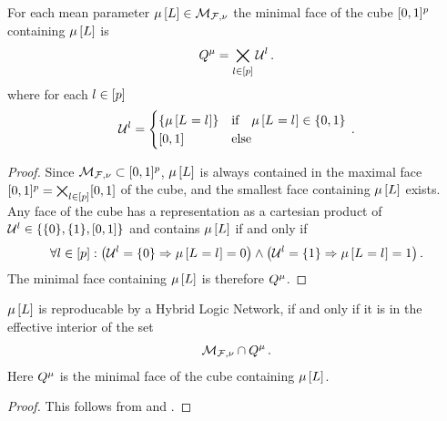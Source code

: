 \begin{lemma}
    \label{lem:minimalContainingFace}
    For each mean parameter $\mu\left[L\right]\in\mathcal{M}_{\mathcal{F},\nu}$ the minimal face of the cube $[0,1]^{p}$ containing $\mu\left[L\right]$ is
    \begin{align*}
        Q^{\mu}
        = \bigtimes_{l\in[p]} \mathcal{U}^{l} \, .
    \end{align*}
    where for each $l\in[p]$
    \begin{align*}
        \mathcal{U}^{l} = \begin{cases}
                                   \{\mu\left[L_{}=l_{}\right]\} & \text{if} \quad \mu\left[L_{}=l_{}\right] \in \{0,1\} \\
                                   [0,1] & \text{else}
        \end{cases} \, .
    \end{align*}
\end{lemma}
\begin{proof}
    Since $\mathcal{M}_{\mathcal{F},\nu}\subset[0,1]^{p}$, $\mu\left[L\right]$ is always contained in the maximal face $[0,1]^{p}=\bigtimes_{l\in[p]}[0,1]$ of the cube, and the smallest face containing $\mu\left[L\right]$ exists.
    Any face of the cube has a representation as a cartesian product of $\mathcal{U}^{l}\in\{\{0\},\{1\},[0,1]\}$ and contains $\mu\left[L\right]$ if and only if
    \begin{align*}
        \forall{l\in[p]}:{\left(\mathcal{U}^{l}=\{0\} \Rightarrow \mu\left[L_{}=l_{}\right]=0 \right) \land \left(\mathcal{U}^{l}=\{1\} \Rightarrow \mu\left[L_{}=l_{}\right]=1 \right)} \, .
    \end{align*}
    The minimal face containing $\mu\left[L\right]$ is therefore $Q^{\mu}$.
\end{proof}

\begin{theorem}
    $\mu\left[L\right]$ is reproducable by a Hybrid Logic Network, if and only if it is in the effective interior of the set
    \begin{align*}
        \mathcal{M}_{\mathcal{F},\nu}\cap Q^{\mu} \, .
    \end{align*}
    Here $Q^{\mu}$ is the minimal face of the cube containing $\mu\left[L\right]$.
\end{theorem}
\begin{proof}
    This follows from  and .
\end{proof}

